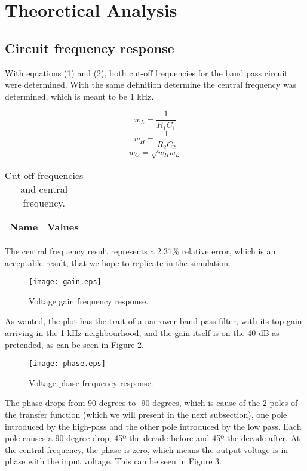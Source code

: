 \section{Theoretical Analysis}
\label{sec:analysis}
\subsection{Circuit frequency response}
With equations (1) and (2), both cut-off frequencies for the band pass circuit were determined. With the same definition determine the central frequency was determined, which is meant to be 1 kHz.


\begin{equation}
w_L=\frac{1}{R_{1}C_{1}}
\end{equation}
\begin{equation}
w_H=\frac{1}{R_{2}C_{2}}
\end{equation}
\begin{equation}
w_O=\sqrt{w_{H}w_{L}}
\end{equation}

\begin{table}[h!]
  \centering
  \begin{tabular}{|l|r|}
    \hline    
    {\bf Name} & {\bf Values} \\ \hline
     
  \end{tabular}
  \caption{Cut-off frequencies and central frequency.}
  \label{tab:data}
\end{table}

The central frequency result represents a 2.31\% relative error, which is an acceptable result, that we hope to replicate in the simulation.

\begin{figure}[h!] \centering
\texttt{[image: gain.eps]}
\caption{Voltage gain frequency response.}
\label{fig:gainfreq}
\end{figure}

As wanted, the plot has the trait of a narrower band-pass filter, with its top gain arriving in the 1 kHz neighbourhood, and the gain itself is on the 40 dB as pretended, as can be seen in Figure 2.

\begin{figure}[h!] \centering
\texttt{[image: phase.eps]}
\caption{Voltage phase frequency response.}
\label{fig:gainfreq}
\end{figure}

The phase drops from 90 degrees to -90 degrees, which is cause of the 2 poles of the transfer function (which we will present in the next subsection), one pole introduced by the high-pass and the other pole introduced by the low pass. Each pole causes a 90 degree drop, 45º the decade before and 45º the decade after. At the central frequency, the phase is zero, which means the output voltage is in phase with the input voltage. This can be seen in Figure 3.

